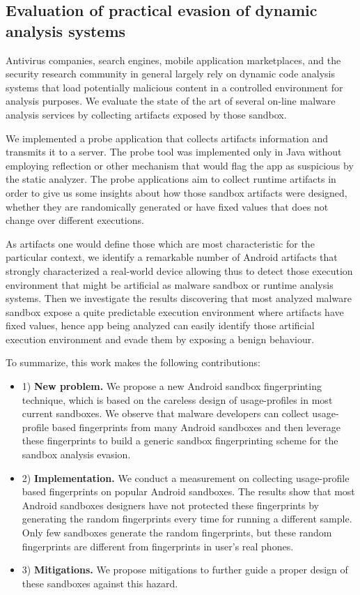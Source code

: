 \subsection{Evaluation of practical evasion of dynamic analysis systems}

Antivirus companies, search engines, mobile application marketplaces, and the security research community in general largely rely on dynamic code analysis systems that load potentially malicious content in a controlled environment for analysis purposes. We evaluate the state of the art of several on-line malware analysis services by collecting artifacts exposed by those sandbox. 

We implemented a probe application that collects artifacts information and transmits it to a server. The probe tool was implemented only in Java without employing reflection or other mechanism that would flag the app as suspicious by the static analyzer. The probe applications aim to collect runtime artifacts in order to give us some insights about how those sandbox artifacts were designed, whether they are randomically generated or have fixed values that does not change over different executions. 

As artifacts one would define those which are most characteristic for the particular context, we identify a remarkable number of Android artifacts that strongly characterized a real-world device allowing thus to detect those execution environment that might be artificial as malware sandbox or runtime analysis systems. Then we investigate the results discovering that most analyzed malware sandbox expose a quite predictable execution environment where artifacts have fixed values, hence app being analyzed can easily identify those artificial execution environment and evade them by exposing a benign behaviour.

To summarize, this work makes the following contributions:
\begin{itemize}
\item 1) {\bf New problem.} We propose a new Android sandbox fingerprinting technique, which is based on the careless design of usage-profiles in most current sandboxes. We observe that malware developers can collect usage-profile based fingerprints from many Android sandboxes and then leverage these fingerprints to build a generic sandbox fingerprinting scheme for the sandbox analysis evasion. 
\item 2) {\bf Implementation.} We conduct a measurement on collecting usage-profile based fingerprints on popular Android sandboxes. The results show that most Android sandboxes designers have not protected these fingerprints by generating the random fingerprints every time for running a different sample. Only few sandboxes generate the random fingerprints, but these random fingerprints are different from fingerprints in user's real phones.
\item 3) {\bf Mitigations.} We propose mitigations to further guide a proper design of these sandboxes against this hazard.
\end{itemize}

